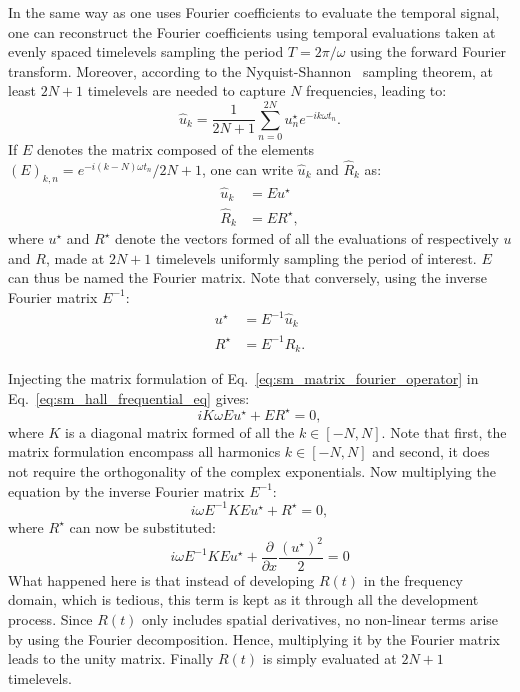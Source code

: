 In the same way as one uses Fourier coefficients to
evaluate the temporal signal,
one can reconstruct the Fourier coefficients using
temporal evaluations taken at evenly spaced timelevels
sampling the period $T = 2 \pi / \omega$ using the forward
Fourier transform. Moreover, 
according to the Nyquist-Shannon~\cite{Shannon1949} sampling theorem, 
at least $2N+1$ timelevels are needed to capture $N$ frequencies,
leading to:
\begin{equation}
	\widehat{u}_k = \frac{1}{2N+1} 
	\sum_{n=0}^{2N} u_n^\star e^{-i k \omega t_n}.
\end{equation}
If $E$ denotes the matrix composed of the elements 
$(E)_{k,n} = e^{-i (k - N) \omega t_n} / 2N+1$, one can write $\widehat{u}_k$
and $\widehat{R}_k$ as:
\begin{equation}
	\begin{split}
		\widehat{u}_k &= E u^\star \\
		\widehat{R}_k &= E R^\star,
	\end{split}
	\label{eq:sm_matrix_fourier_operator}
\end{equation}
where $u^\star$ and $R^\star$ 
denote the vectors formed of all the evaluations of respectively $u$
and $R$,
made at $2N+1$ timelevels uniformly sampling the period of interest. 
$E$ can thus be named the Fourier matrix.
Note that conversely, using the inverse Fourier matrix $E^{-1}$:
\begin{equation}
	\begin{split}
		u^\star &= E^{-1} \widehat{u}_k \\
		R^\star &= E^{-1} \widehat{R}_k.
	\end{split}
\end{equation}

Injecting the matrix formulation of 
Eq.~\ref{eq:sm_matrix_fourier_operator} in 
Eq.~\ref{eq:sm_hall_frequential_eq}
gives:
\begin{equation}
	i K \omega E u^\star + E R^\star = 0,
\end{equation}
where $K$ is a diagonal matrix formed of all the $k \in [-N, N]$.
Note that first, the matrix formulation encompass all harmonics
$k \in [-N, N]$ and second, it does not require the
orthogonality of the complex exponentials.
Now multiplying the equation by the inverse Fourier matrix $E^{-1}$:
\begin{equation}
	i \omega E^{-1} K E u^\star + R^\star = 0,
\end{equation}
where $R^\star$ can now be substituted:
\begin{equation}
		i \omega E^{-1} K E u^\star + 
		\displaystyle \frac{\partial}{\partial x}
		\frac{(u^\star)^2}{2} = 0
\end{equation}
What happened here is that instead of developing $R(t)$
in the frequency domain, which is tedious, this term is kept
as it through all the development process. 
Since $R(t)$ only includes spatial derivatives, no non-linear
terms
arise by using the Fourier decomposition. Hence, multiplying it
by the Fourier matrix leads to the unity matrix. 
Finally $R(t)$ is simply evaluated at $2N+1$ timelevels.

